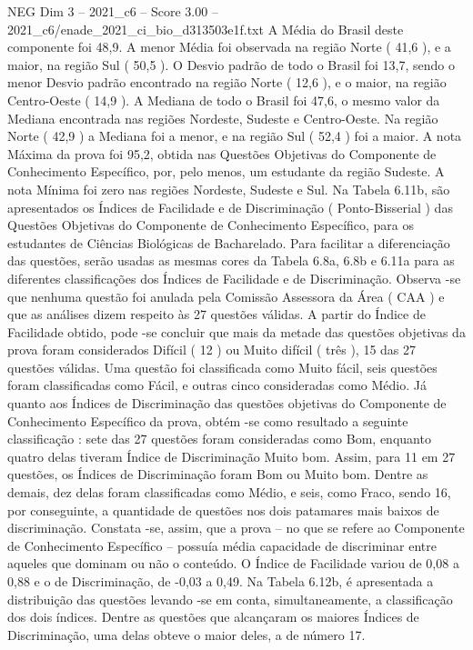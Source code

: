 \begin{textsample}{NEG Dim 3 – 2021\_c6 – Score 3.00 – 2021\_c6/enade\_2021\_ci\_bio\_d313503e1f.txt}
A Média do Brasil deste componente foi 48,9.
A menor Média foi observada na região Norte ( 41,6 ), e a maior, na região Sul ( 50,5 ).
O Desvio padrão de todo o Brasil foi 13,7, sendo o menor Desvio padrão encontrado na região Norte ( 12,6 ), e o maior, na região Centro-Oeste ( 14,9 ).
A Mediana de todo o Brasil foi 47,6, o mesmo valor da Mediana encontrada nas regiões Nordeste, Sudeste e Centro-Oeste.
Na região Norte ( 42,9 ) a Mediana foi a menor, e na região Sul ( 52,4 ) foi a maior.
A nota Máxima da prova foi 95,2, obtida nas Questões Objetivas do Componente de Conhecimento Específico, por, pelo menos, um estudante da região Sudeste.
A nota Mínima foi zero nas regiões Nordeste, Sudeste e Sul.
Na Tabela 6.11b, são apresentados os Índices de Facilidade e de Discriminação ( Ponto-Bisserial ) das Questões Objetivas do Componente de Conhecimento Específico, para os estudantes de Ciências Biológicas de Bacharelado.
Para facilitar a diferenciação das questões, serão usadas as mesmas cores da Tabela 6.8a, 6.8b e 6.11a para as diferentes classificações dos Índices de Facilidade e de Discriminação.
Observa -se que nenhuma questão foi anulada pela Comissão Assessora da Área ( CAA ) e que as análises dizem respeito às 27 questões válidas.
A partir do Índice de Facilidade obtido, pode -se concluir que mais da metade das questões objetivas da prova foram considerados Difícil ( 12 ) ou Muito difícil ( três ), 15 das 27 questões válidas.
Uma questão foi classificada como Muito fácil, seis questões foram classificadas como Fácil, e outras cinco consideradas como Médio.
Já quanto aos Índices de Discriminação das questões objetivas do Componente de Conhecimento Específico da prova, obtém -se como resultado a seguinte classificação : sete das 27 questões foram consideradas como Bom, enquanto quatro delas tiveram Índice de Discriminação Muito bom.
Assim, para 11 em 27 questões, os Índices de Discriminação foram Bom ou Muito bom.
Dentre as demais, dez delas foram classificadas como Médio, e seis, como Fraco, sendo 16, por conseguinte, a quantidade de questões nos dois patamares mais baixos de discriminação.
Constata -se, assim, que a prova – no que se refere ao Componente de Conhecimento Específico – possuía média capacidade de discriminar entre aqueles que dominam ou não o conteúdo.
O Índice de Facilidade variou de 0,08 a 0,88 e o de Discriminação, de -0,03 a 0,49.
Na Tabela 6.12b, é apresentada a distribuição das questões levando -se em conta, simultaneamente, a classificação dos dois índices.
Dentre as questões que alcançaram os maiores Índices de Discriminação, uma delas obteve o maior deles, a de número 17.

\end{textsample}
